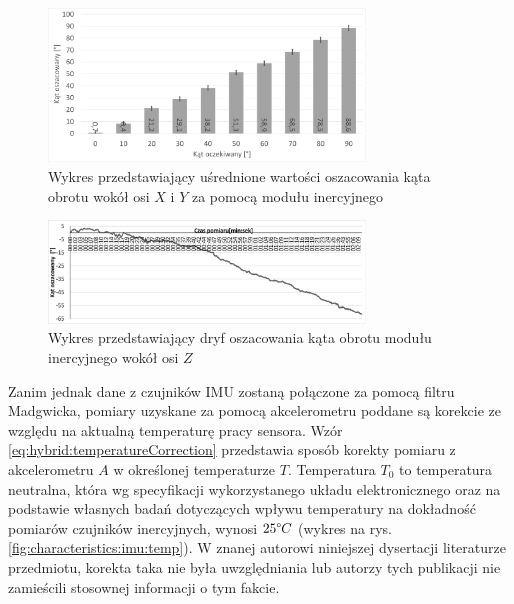\begin{figure}[!htb]
	
		\centering 
		\includegraphics[width=0.75\textwidth]{images/imumeasuredAngles.png}
		\caption{Wykres przedstawiający uśrednione wartości oszacowania kąta obrotu wokół osi $X$ i $Y$ za pomocą modułu inercyjnego}
		\label{fig:hybrid:imu:XYRot}
	\end{figure}
\begin{figure}[!htb]
		\centering 
		\includegraphics[width=0.75\textwidth]{images/imuDrift.png}
		\caption{Wykres przedstawiający dryf oszacowania kąta obrotu modułu inercyjnego wokół osi $Z$}
		\label{fig:hybrid:imu:drift}

\end{figure}

Zanim jednak dane z czujników IMU zostaną połączone za pomocą filtru Madgwicka, pomiary uzyskane za pomocą akcelerometru poddane są korekcie ze względu na aktualną temperaturę pracy sensora. Wzór \eqref{eq:hybrid:temperatureCorrection} przedstawia sposób korekty pomiaru z akcelerometru  $A$ w określonej temperaturze $T$. Temperatura $T_0$ to temperatura neutralna, która wg specyfikacji wykorzystanego układu elektronicznego oraz na podstawie własnych badań 
dotyczących wpływu temperatury na dokładność pomiarów czujników inercyjnych, wynosi $25\degree C$ (wykres na rys. \ref{fig:characteristics:imu:temp}). W znanej autorowi niniejszej dysertacji literaturze przedmiotu, korekta taka nie była uwzględniania lub autorzy tych publikacji nie zamieścili stosownej informacji o tym fakcie.

